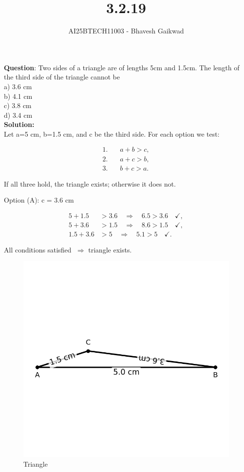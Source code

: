 \documentclass[journal]{IEEEtran}
\begin{document}

\vspace{3cm}

\title{3.2.19}
\author{AI25BTECH11003 - Bhavesh Gaikwad}
{\let\newpage\relax\maketitle}

\renewcommand{\thefigure}{\theenumi}
\renewcommand{\thetable}{\theenumi}
\setlength{\intextsep}{10pt} 


\renewcommand{\thetable}{\theenumi}


\textbf{Question}: Two sides of a triangle are of lengths 5cm and 1.5cm. The length of the third side of the triangle cannot be\\
a) 3.6 cm\\
b) 4.1 cm\\
c) 3.8 cm\\
d) 3.4 cm\\

\textbf{Solution:}\\

Let a=5 cm, b=1.5 cm, and c be the third side. For each option we test:

\begin{align}
1.\quad &a + b > c,\\
2.\quad &a + c > b,\\
3.\quad &b + c > a.
\end{align}

If all three hold, the triangle exists; otherwise it does not.

\bigskip

Option (A): c = 3.6 cm

\begin{align}
5 + 1.5 &> 3.6 \quad\Rightarrow\quad 6.5 > 3.6\quad\checkmark,\\
5 + 3.6 &> 1.5 \quad\Rightarrow\quad 8.6 > 1.5\quad\checkmark,\\
1.5 + 3.6 &> 5 \quad\Rightarrow\quad 5.1 > 5\quad\checkmark.
\end{align}

All conditions satisfied $\;\Rightarrow$ triangle exists.

\begin{figure}[htbp]
\centering
\includegraphics[width=0.3\columnwidth]{figs/fig1.png}
\caption{Triangle}
\label{fig:figs/fig1.png}
\end{figure}
\end{document}
